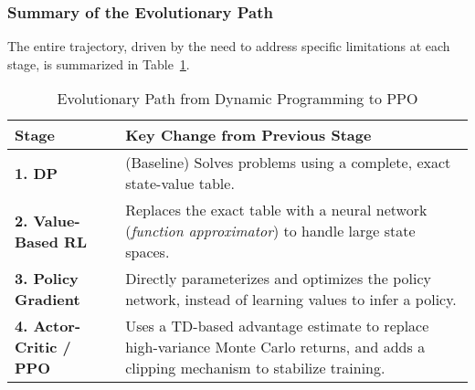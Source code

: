 \subsubsection{Summary of the Evolutionary Path}
The entire trajectory, driven by the need to address specific limitations at each stage, is summarized in Table~\ref{tab:evolution_path}.

\begin{table}[htbp]
    \centering
    \small
    \caption{Evolutionary Path from Dynamic Programming to PPO}
    \label{tab:evolution_path}
    \begin{tabularx}{\textwidth}{l >{\raggedright\arraybackslash}X}
        \toprule
        \textbf{Stage} & \textbf{Key Change from Previous Stage} \\
        \midrule
        \textbf{1. DP} & 
        (Baseline) Solves problems using a complete, exact state-value table. \\

        \textbf{2. Value-Based RL} & 
        Replaces the exact table with a neural network (\textit{function approximator}) to handle large state spaces. \\

        \textbf{3. Policy Gradient} & 
        Directly parameterizes and optimizes the policy network, instead of learning values to infer a policy. \\

        \textbf{4. Actor-Critic / PPO} & 
        Uses a TD-based advantage estimate to replace high-variance Monte Carlo returns, and adds a clipping mechanism to stabilize training. \\
        \bottomrule
    \end{tabularx}
\end{table}